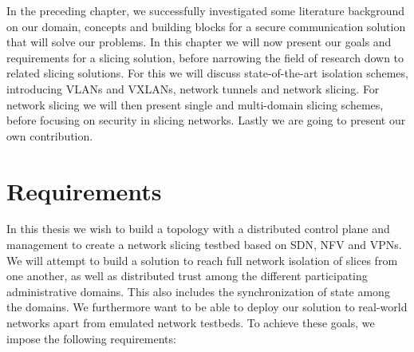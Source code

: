 

In the preceding chapter, we successfully investigated some literature background on our domain, concepts and building blocks for a secure communication solution that will solve our problems. In this chapter we will now present our goals and requirements for a slicing solution, before narrowing the field of research down to related slicing solutions. For this we will discuss state-of-the-art isolation schemes, introducing VLANs and VXLANs, network tunnels and network slicing. For network slicing we will then present single and multi-domain slicing schemes, before focusing on security in slicing networks. Lastly we are going to present our own contribution.

\section{Requirements}
\label{related_work_requirements}
In this thesis we wish to build a topology with a distributed control plane and management to create a network slicing testbed based on SDN, NFV and VPNs. We will attempt to build a solution to reach full network isolation of slices from one another, as well as distributed trust among the different participating administrative domains. This also includes the synchronization of state among the domains. We furthermore want to be able to deploy our solution to real-world networks apart from emulated network testbeds.
To achieve these goals, we impose the following requirements:

